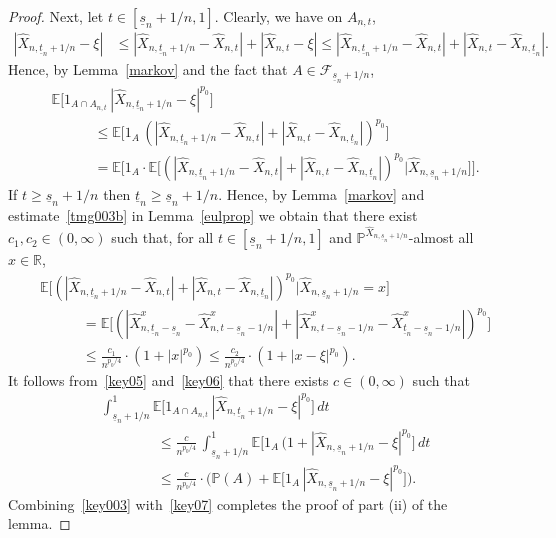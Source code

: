 \documentclass[11pt]{amsart}
\newcommand{\R}{{\mathbb R}}
\newcommand{\EE}{{\mathbb E}}
\newcommand{\PP}{{\mathbb P}}
\newcommand{\eul}{{\widehat X}}
\newcommand{\ind}{1}
\newcommand{\usn}{\underline {s}_n}
\newcommand{\utn}{\underline {t}_n}
\theoremstyle{plain}
\theoremstyle{definition}
\begin{document}
\begin{proof}
Next, let $t\in [\usn+1/n, 1]$.  Clearly, we have on $A_{n,t}$,
\begin{align*}
|\eul_{n,\utn+1/n}-\xi| &\le |\eul_{n,\utn+1/n}-\eul_{n,t}| + |\eul_{n,t}-\xi| \le |\eul_{n,\utn+1/n}-\eul_{n,t}| + |\eul_{n,t}-\eul_{n,\utn}|.
\end{align*}
Hence, by Lemma~\ref{markov} and the fact that $A\in  \mathcal F_{\usn+1/n}$,
\begin{equation}\label{key05}
\begin{aligned}
& \EE\bigl[\ind_{A\cap A_{n,t}}\, |\eul_{n,\utn+1/n} - \xi|^{p_0}\bigr] \\ &  \qquad\quad  \le \EE \bigl[\ind_A \, (|\eul_{n,\utn+1/n}-\eul_{n,t}| + |\eul_{n,t}-\eul_{n,\utn}|)^{p_0} \bigr]\\ & \qquad\quad = \EE\bigl[ \ind_A \cdot \EE\bigl[(|\eul_{n,\utn+1/n}-\eul_{n,t}| + |\eul_{n,t}-\eul_{n,\utn}|)^{p_0}\bigl| \eul_{n,\usn+1/n}\bigr]\bigr].
\end{aligned}
\end{equation}
If $t\ge \usn+1/n$ then $\utn \ge \usn+1/n$. Hence, by Lemma~\ref{markov} and estimate~\eqref{tmg003b}
in Lemma~\ref{eulprop} we obtain that there exist $c_1, c_2\in(0, \infty)$ such that,  for all  $t\in [\usn+1/n, 1]$ and
$\PP ^{\eul_{n,\usn+1/n}} $-almost all
$x\in\R$,
\begin{equation}\label{key06}
\begin{aligned}
&  \EE\bigl[(|\eul_{n,\utn+1/n}-\eul_{n,t}| + |\eul_{n,t}-\eul_{n,\utn}|)^{p_0}\bigl| \eul_{n,\usn+1/n} = x\bigr]\\
& \qquad \quad = \EE\bigl[(|\eul^x_{n,\utn-\usn}-\eul^x_{n,t-\usn-1/n}| + |\eul^x_{n,t-\usn-1/n}-\eul^x_{\utn-\usn-1/n}|)^{p_0}\bigr]
\\& \qquad\quad \le  \frac{c_1}{n^{p_0/4}}\cdot (1+|x|^{p_0})
\le  \frac{c_2}{n^{p_0/4}}\cdot (1+|x-\xi|^{p_0}).
\end{aligned}
\end{equation}
It follows from~\eqref{key05} and~\eqref{key06} that there exists $c\in(0, \infty)$ such that
\begin{equation}\label{key07}
\begin{aligned}
& \int_{\usn+1/n}^1\EE\bigl[\ind_{A\cap A_{n,t}}\, |\eul_{n,\utn+1/n} - \xi|^{p_0}\bigr]\, dt \\
& \qquad\qquad  \le \frac{c}{n^{p_0/4}}
\, \int_{\usn+1/n}^1 \EE\bigl[\ind_A\, (1+|\eul_{n,\usn+1/n}-\xi|^{p_0}\bigr]\, dt\\
& \qquad\qquad \le \frac{c}{n^{p_0/4}}
\cdot \bigl(\PP(A) + \EE\bigl[\ind_A\, |\eul_{n,\usn+1/n}-\xi|^{p_0}\bigr]\bigr).
\end{aligned}
\end{equation}
Combining~\eqref{key003} with~\eqref{key07} completes the proof of part (ii) of the lemma.
\end{proof}
\end{document}
